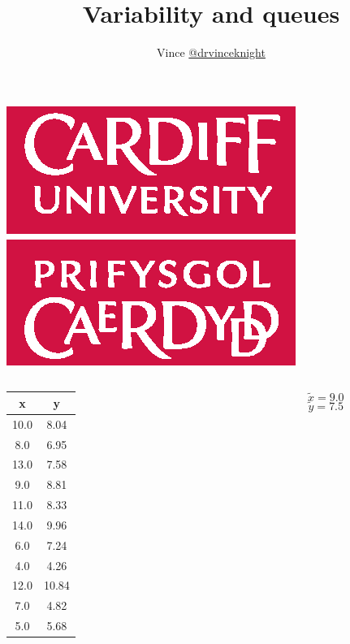 \documentclass{beamer}
\title{Variability and queues}
\author{Vince \href{https://twitter.com/drvinceknight}{@drvinceknight}}
\date{}
\begin{document}
\begin{frame}
    \maketitle
	\begin{center}
		\includegraphics[width=.3\textwidth]{./img/CUident_CMYK.eps}
	\end{center}
\end{frame}

\begin{frame}
    \Large
	\begin{columns}
		\begin{column}{.5\textwidth}
			\begin{center}
				\begin{tabular}{cc}
					\toprule
					x &      y \\
					\midrule
					10.0 & 8.04 \\
					8.0 & 6.95 \\
					13.0 & 7.58 \\
					9.0 & 8.81 \\
					11.0 & 8.33 \\
					14.0 & 9.96 \\
					6.0 & 7.24 \\
					4.0 & 4.26 \\
					12.0 & 10.84 \\
					7.0 &  4.82 \\
					5.0 & 5.68 \\
					\bottomrule
				\end{tabular}
			\end{center}
		\end{column}
		\begin{column}{.5\textwidth}
            \pause
            \[
            \tilde x = 9.0
            \]
            \pause
            \[
            \tilde y = 7.5
            \]
        \end{column}
	\end{columns}
\end{frame}
\end{document}
